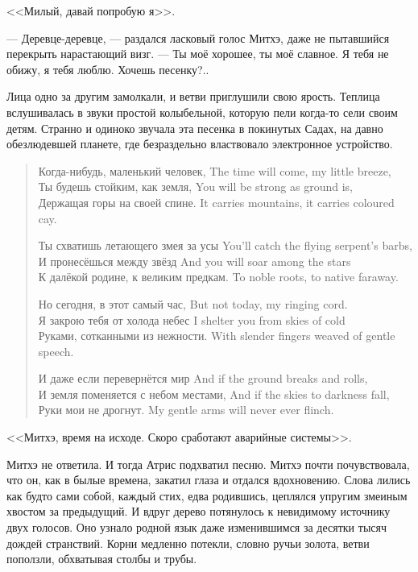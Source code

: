 <<Милый, давай попробую я>>.

--- Деревце-деревце, --- раздался ласковый голос Митхэ, даже не пытавшийся перекрыть нарастающий визг.
--- Ты моё хорошее, ты моё славное.
Я тебя не обижу, я тебя люблю.
Хочешь песенку?..

Лица одно за другим замолкали, и ветви приглушили свою ярость.
Теплица вслушивалась в звуки простой колыбельной, которую пели когда-то сели своим детям.
Странно и одиноко звучала эта песенка в покинутых Садах, на давно обезлюдевшей планете, где безраздельно властвовало электронное устройство.

\begin{verse}
{Когда-нибудь, маленький человек,}
{The time will come, my little breeze,}\\
{Ты будешь стойким, как земля,}
{You will be strong as ground is,}\\
{Держащая горы на своей спине.}
{It carries mountains, it carries coloured cay.}

{Ты схватишь летающего змея за усы}
{You'll catch the flying serpent's barbs,}\\
{И пронесёшься между звёзд}
{And you will soar among the stars}\\
{К далёкой родине, к великим предкам.}
{To noble roots, to native faraway.}

{Но сегодня, в этот самый час,}
{But not today, my ringing cord.}\\
{Я закрою тебя от холода небес}
{I shelter you from skies of cold}\\
{Руками, сотканными из нежности.}
{With slender fingers weaved of gentle speech.}

{И даже если перевернётся мир}
{And if the ground breaks and rolls,}\\
{И земля поменяется с небом местами,}
{And if the skies to darkness fall,}\\
{Руки мои не дрогнут.}
{My gentle arms will never ever flinch.}
\end{verse}

<<Митхэ, время на исходе.
Скоро сработают аварийные системы>>.

Митхэ не ответила.
И тогда Атрис подхватил песню.
Митхэ почти почувствовала, что он, как в былые времена, закатил глаза и отдался вдохновению.
Слова лились как будто сами собой, каждый стих, едва родившись, цеплялся упругим змеиным хвостом за предыдущий.
И вдруг дерево потянулось к невидимому источнику двух голосов.
Оно узнало родной язык даже изменившимся за десятки тысяч дождей странствий.
Корни медленно потекли, словно ручьи золота, ветви поползли, обхватывая столбы и трубы.

